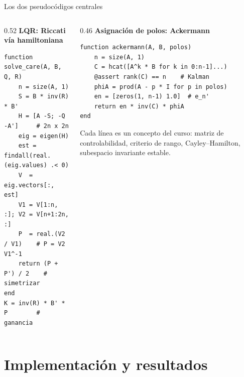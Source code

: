 \documentclass[aspectratio=169,11pt]{beamer}
\begin{document}
\begin{frame}[fragile]{Los dos pseudocódigos centrales}
  \begin{columns}[T]
    \begin{column}{0.52\textwidth}
      \small\textbf{LQR: Riccati v\'ia hamiltoniana}
\begin{lstlisting}
function solve_care(A, B, Q, R)
    n = size(A, 1)
    S = B * inv(R) * B'
    H = [A -S; -Q -A']     # 2n x 2n
    eig = eigen(H)
    est = findall(real.(eig.values) .< 0)
    V  = eig.vectors[:, est]
    V1 = V[1:n, :]; V2 = V[n+1:2n, :]
    P  = real.(V2 / V1)    # P = V2 V1^-1
    return (P + P') / 2    # simetrizar
end
K = inv(R) * B' * P        # ganancia
\end{lstlisting}
    \end{column}
    \begin{column}{0.46\textwidth}
      \small\textbf{Asignaci\'on de polos: Ackermann}
\begin{lstlisting}
function ackermann(A, B, polos)
    n = size(A, 1)
    C = hcat([A^k * B for k in 0:n-1]...)
    @assert rank(C) == n    # Kalman
    phiA = prod(A - p * I for p in polos)
    en = [zeros(1, n-1) 1.0]  # e_n'
    return en * inv(C) * phiA
end
\end{lstlisting}
      \vspace{0.2em}
      \scriptsize Cada l\'inea es un concepto del curso: matriz de
      controlabilidad, criterio de rango, Cayley--Hamilton, subespacio
      invariante estable.
    \end{column}
  \end{columns}
\end{frame}

\section{Implementación y resultados}
\end{document}

